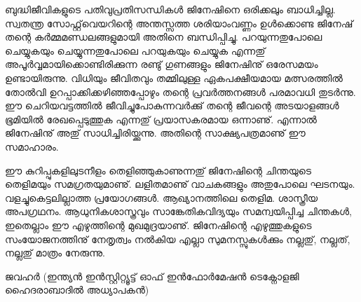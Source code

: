 ബുദ്ധിജീവികളുടെ പതിവുപ്രതിസന്ധികള്‍ ജിനേഷിനെ ഒരിക്കലും ബാധിച്ചില്ല. സ്വതന്ത്ര സോഫ്റ്റ്‌വെയറിന്റെ അന്തസ്സത്ത ശരിയാംവണ്ണം 
ഉള്‍ക്കൊണ്ട ജിനേഷ് തന്റെ കര്‍മ്മമണ്ഡലങ്ങളുമായി അതിനെ ബന്ധിപ്പിച്ചു. പറയുന്നതുപോലെ ചെയ്യുകയും ചെയ്യുന്നതുപോലെ പറയുകയും 
ചെയ്യുക എന്നതു് അപൂര്‍വ്വമായിക്കൊണ്ടിരിക്കുന്ന രണ്ടു് ഗുണങ്ങളും ജിനേഷിനു് ഒരേസമയം ഉണ്ടായിരുന്നു. വിധിയും ജീവിതവും തമ്മിലുള്ള 
ഏകപക്ഷീയമായ മത്സരത്തില്‍ തോല്‍വി ഉറപ്പാക്കിക്കഴിഞ്ഞപ്പോഴും തന്റെ പ്രവര്‍ത്തനങ്ങള്‍ പരമാവധി തുടര്‍ന്നു.  ഈ ചെറിയവട്ടത്തില്‍ 
ജീവിച്ചുപോകുന്നവര്‍ക്കു് തന്റെ ജീവന്റെ അടയാളങ്ങള്‍ ഭൂമിയില്‍ രേഖപ്പെടുത്തുക എന്നതു് പ്രയാസകരമായ ഒന്നാണു്. എന്നാല്‍ ജിനേഷിനു് 
അതു് സാധിച്ചിരിയ്ക്കുന്നു. അതിന്റെ സാക്ഷ്യപത്രമാണു് ഈ സമാഹാരം.

ഈ കുറിപ്പുകളിലുടനീളം തെളിഞ്ഞുകാണുന്നതു് ജിനേഷിന്റെ ചിന്തയുടെ തെളിമയും സമഗ്രതയുമാണു്. ലളിതമാണു് വാചകങ്ങളും അതുപോലെ ഘടനയും. 
വളച്ചുകെട്ടലില്ലാത്ത പ്രയോഗങ്ങള്‍. ആഖ്യാനത്തിലെ തെളിമ. ശാസ്ത്രീയ അപഗ്രഥനം. ആധുനികശാസ്ത്രവും സാങ്കേതികവിദ്യയും സമന്വയിപ്പിച്ച 
ചിന്തകള്‍, ഇതെല്ലാം ഈ എഴുത്തിന്റെ മുഖമുദ്രയാണു്. ജിനേഷിന്റെ എഴുത്തുകളുടെ സംയോജനത്തിനു് നേതൃത്വം നല്‍കിയ എല്ലാ സുമനസ്സുകള്‍ക്കും 
നല്ലതു്, നല്ലത്, നല്ലതു് മാത്രം നേരുന്നു. 

\hspace*{2em}ജവഹര്‍ (ഇന്ത്യന്‍ ഇന്‍സ്റ്റിറ്റ്യൂട്ട് ഓഫ് ഇന്‍ഫോര്‍മേഷന്‍ ടെക്നോളജി ഹൈദരാബാദില്‍ അധ്യാപകന്‍) 
\newpage
